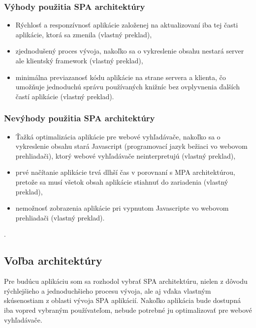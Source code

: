 \subsubsection*{Výhody použitia SPA architektúry}

\begin{itemize}
	\item Rýchlosť a responzívnosť aplikácie založenej na aktualizovaní iba tej časti aplikácie, ktorá sa zmenila \cite{spa-vs-mpa-1} (vlastný preklad),
	\item zjednodušený proces vývoja, nakoľko sa o vykreslenie obsahu nestará server ale klientský framework \cite{spa-vs-mpa-3} (vlastný preklad),
	\item minimálna previazanosť kódu aplikácie na strane servera a klienta, čo umožňuje jednoduchú správu používaných knižníc bez ovplyvnenia ďalších častí aplikácie \cite{spa-vs-mpa-2} (vlastný preklad).
\end{itemize}


\subsubsection*{Nevýhody použitia SPA architektúry}

\begin{itemize}
	\item Ťažká optimalizácia aplikácie pre webové vyhľadávače, nakoľko sa o vykreslenie obsahu stará Javascript (programovací jazyk bežiaci vo webovom prehliadači), ktorý webové vyhľadávače neinterpretujú \cite{spa-vs-mpa-1} (vlastný preklad),
	\item prvé načítanie aplikácie trvá dlhší čas v porovnaní s MPA architektúrou, pretože sa musí všetok obsah aplikácie stiahnuť do zariadenia \cite{spa-vs-mpa-1} (vlastný preklad),
	\item nemožnosť zobrazenia aplikácie pri vypnutom Javascripte vo webovom prehliadači \cite{spa-vs-mpa-2} (vlastný preklad).
\end{itemize}.


\subsection{Voľba architektúry}

Pre budúcu aplikáciu som sa rozhodol vybrať SPA architektúru, nielen z dôvodu rýchlejšieho a jednoduchšieho procesu vývoja, ale aj vďaka vlastným skúsenostiam z oblasti vývoja SPA aplikácií. Nakoľko aplikácia bude dostupná iba vopred vybraným používateľom, nebude potrebné ju optimalizovať pre webové vyhľadávače.

